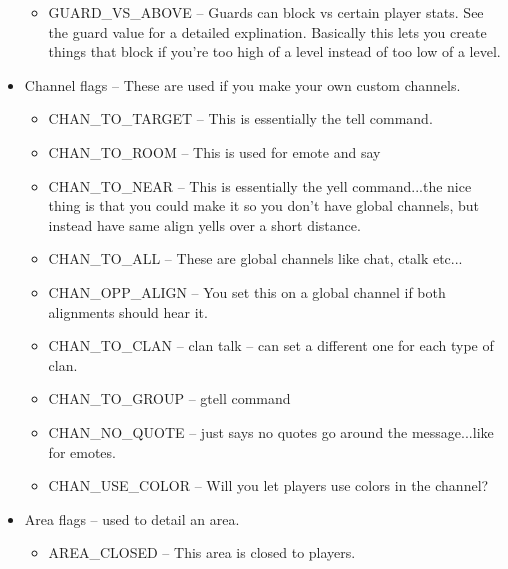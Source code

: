 \begin{itemize}
\begin{itemize}
\item GUARD\_VS\_ABOVE -- Guards can block vs certain player stats. See the guard value for a detailed explination. Basically this lets you create things that block if you're too high of a level instead of too low of a level.

\end{itemize}


\item Channel flags -- These are used if you make your own custom channels.

\begin{itemize}

\item CHAN\_TO\_TARGET -- This is essentially the tell command.

\item CHAN\_TO\_ROOM -- This is used for emote and say

\item CHAN\_TO\_NEAR -- This is essentially the yell command...the nice thing
is that you could make it so you don't have global channels, but instead have same align yells over a short distance.

\item CHAN\_TO\_ALL -- These are global channels like chat, ctalk etc...

\item CHAN\_OPP\_ALIGN -- You set this on a global channel if both alignments should hear it.

\item CHAN\_TO\_CLAN -- clan talk -- can set a different one for each type of clan.

\item CHAN\_TO\_GROUP -- gtell command

\item CHAN\_NO\_QUOTE -- just says no quotes go around the message...like for emotes.

\item CHAN\_USE\_COLOR -- Will you let players use colors in the channel?


\end{itemize}


\item Area flags -- used to detail an area.

\begin{itemize}

\item AREA\_CLOSED -- This area is closed to players.


\end{itemize}
\end{itemize}
